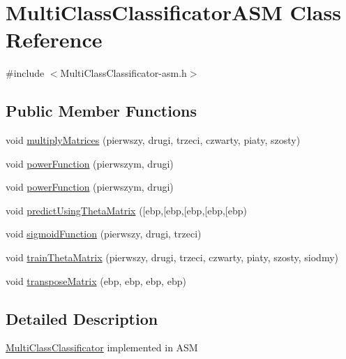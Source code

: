 \hypertarget{class_multi_class_classificator_a_s_m}{\section{Multi\-Class\-Classificator\-A\-S\-M Class Reference}
\label{class_multi_class_classificator_a_s_m}
}


{\ttfamily \#include $<$Multi\-Class\-Classificator-\/asm.\-h$>$}

\subsection*{Public Member Functions}
\begin{DoxyCompactItemize}
\item 
void \hyperlink{class_multi_class_classificator_a_s_m_a90fa2bf0546813be26b28322101bc865}{multiply\-Matrices} (pierwszy, drugi, trzeci, czwarty, piaty, szosty)
\item 
void \hyperlink{class_multi_class_classificator_a_s_m_af2caef1f8bd96734ce3bae7a510c8db8}{power\-Function} (pierwszym, drugi)
\item 
void \hyperlink{class_multi_class_classificator_a_s_m_af2caef1f8bd96734ce3bae7a510c8db8}{power\-Function} (pierwszym, drugi)
\item 
void \hyperlink{class_multi_class_classificator_a_s_m_a2fa9bb7af0fd5963b189495ce5f9e016}{predict\-Using\-Theta\-Matrix} (\mbox{[}ebp,\mbox{[}ebp,\mbox{[}ebp,\mbox{[}ebp,\mbox{[}ebp)
\item 
void \hyperlink{class_multi_class_classificator_a_s_m_ab08b099d46e5c47695f389cedf25e8b3}{sigmoid\-Function} (pierwszy, drugi, trzeci)
\item 
void \hyperlink{class_multi_class_classificator_a_s_m_a456f3c0e41414ccaddbf0f5492a2c14a}{train\-Theta\-Matrix} (pierwszy, drugi, trzeci, czwarty, piaty, szosty, siodmy)
\item 
void \hyperlink{class_multi_class_classificator_a_s_m_aafd1d8c2b655d342b9a37be4b740370f}{transpose\-Matrix} (ebp, ebp, ebp, ebp)
\end{DoxyCompactItemize}


\subsection{Detailed Description}
\hyperlink{class_multi_class_classificator}{Multi\-Class\-Classificator} implemented in A\-S\-M 

